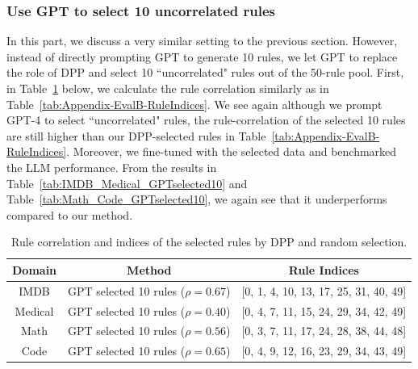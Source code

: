 \documentclass{article}
\begin{document}
\subsubsection{Use GPT to select 10 uncorrelated rules}
In this part, we discuss a very similar setting to the previous section. However, instead of directly prompting GPT to generate 10 rules, we let GPT to replace the role of DPP and select 10 ``uncorrelated" rules out of the 50-rule pool. First, in Table~\ref{tab:Appendix-EvalB-RuleIndices-GPTselected10} below, we calculate the rule correlation similarly as in Table~\ref{tab:Appendix-EvalB-RuleIndices}. We see again although we prompt GPT-4 to select ``uncorrelated" rules, the rule-correlation of the selected 10 rules are still higher than our DPP-selected rules in Table~\ref{tab:Appendix-EvalB-RuleIndices}. Moreover, we fine-tuned with the selected data and benchmarked the LLM performance. From the results in Table~\ref{tab:IMDB_Medical_GPTselected10} and Table~\ref{tab:Math_Code_GPTselected10}, we again see that it underperforms compared to our method.

\begin{table}[htbp]
\centering

\begin{tabular}{c|c|c} 
\hline
\textbf{Domain} & \textbf{Method} & \textbf{Rule Indices} \\ 
\hline
\multirow{1}{*}{IMDB} & GPT selected 10 rules ($\rho = 0.67$) & [0, 1, 4, 10, 13, 17, 25, 31, 40, 49] \\
\cline{2-3}
\hline
\multirow{1}{*}{Medical} & GPT selected 10 rules  ($\rho = 0.40$) & [0, 4, 7, 11, 15, 24, 29, 34, 42, 49] \\
\hline
\multirow{1}{*}{Math} & GPT selected 10 rules  ($\rho = 0.56$) & [0, 3, 7, 11, 17, 24, 28, 38, 44, 48]\\
\hline
\multirow{1}{*}{Code} & GPT selected 10 rules  ($\rho = 0.65$) & [0, 4, 9, 12, 16, 23, 29, 34, 43, 49] \\
\hline
\end{tabular}
\caption{Rule correlation and indices of the selected rules by DPP and random selection.}
\label{tab:Appendix-EvalB-RuleIndices-GPTselected10}
\end{table}
\end{document}

